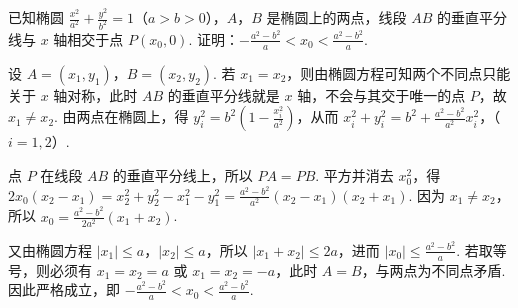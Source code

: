 \documentclass[UTF8,a4paper,oneside,11pt]{ctexbook}
\begin{document}
\begin{problem}
已知椭圆 \(\frac{x^2}{a^2}+\frac{y^2}{b^2}=1\)（\(a>b>0\)），\(A\)，\(B\) 是椭圆上的两点，线段 \(AB\) 的垂直平分线与 \(x\) 轴相交于点 \(P(x_0,0)\). 证明：\(-\frac{a^2-b^2}{a}<x_0<\frac{a^2-b^2}{a}\).

\begin{solution}
设 \(A=(x_1,y_1)\)，\(B=(x_2,y_2)\). 若 \(x_1=x_2\)，则由椭圆方程可知两个不同点只能关于 \(x\) 轴对称，此时 \(AB\) 的垂直平分线就是 \(x\) 轴，不会与其交于唯一的点 \(P\)，故 \(x_1\neq x_2\). 由两点在椭圆上，得
\(y_i^2=b^2\left(1-\frac{x_i^2}{a^2}\right)\)，从而
\(x_i^2+y_i^2=b^2+\frac{a^2-b^2}{a^2}x_i^2\)，（\(i=1,2\)）.

点 \(P\) 在线段 \(AB\) 的垂直平分线上，所以 \(PA=PB\). 平方并消去 \(x_0^2\)，得
\(2x_0(x_2-x_1)=x_2^2+y_2^2-x_1^2-y_1^2=\frac{a^2-b^2}{a^2}(x_2-x_1)(x_2+x_1)\). 因为 \(x_1\neq x_2\)，所以
\(x_0=\frac{a^2-b^2}{2a^2}(x_1+x_2)\).

又由椭圆方程 \(|x_1|\leqslant a\)，\(|x_2|\leqslant a\)，所以 \(|x_1+x_2|\leqslant2a\)，进而 \(|x_0|\leqslant\frac{a^2-b^2}{a}\). 若取等号，则必须有 \(x_1=x_2=a\) 或 \(x_1=x_2=-a\)，此时 \(A=B\)，与两点为不同点矛盾. 因此严格成立，即
\( -\frac{a^2-b^2}{a}<x_0<\frac{a^2-b^2}{a}\).
\end{solution}
\end{problem}

\end{document}
